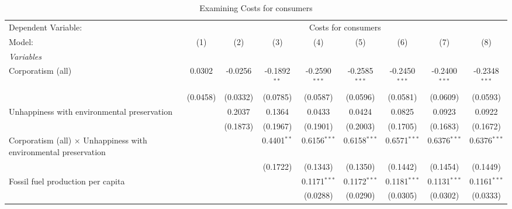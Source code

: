
\begin{table}[htbp]
   \caption{Examining Costs for consumers}
   \centering
   \begin{tabular}{lcccccccc}
      \tabularnewline \midrule \midrule
      Dependent Variable: & \multicolumn{8}{c}{Costs for consumers}\\
      Model:                                                                  & (1)      & (2)      & (3)            & (4)             & (5)             & (6)             & (7)                    & (8)\\  
      \midrule
      \emph{Variables}\\
      Corporatism (all)                                                       & 0.0302   & -0.0256  & -0.1892$^{**}$ & -0.2590$^{***}$ & -0.2585$^{***}$ & -0.2450$^{***}$ & -0.2400$^{***}$        & -0.2348$^{***}$\\   
                                                                              & (0.0458) & (0.0332) & (0.0785)       & (0.0587)        & (0.0596)        & (0.0581)        & (0.0609)               & (0.0593)\\   
      Unhappiness with environmental preservation                             &          & 0.2037   & 0.1364         & 0.0433          & 0.0424          & 0.0825          & 0.0923                 & 0.0922\\   
                                                                              &          & (0.1873) & (0.1967)       & (0.1901)        & (0.2003)        & (0.1705)        & (0.1683)               & (0.1672)\\   
      Corporatism (all) $\times$ Unhappiness with environmental preservation  &          &          & 0.4401$^{**}$  & 0.6156$^{***}$  & 0.6158$^{***}$  & 0.6571$^{***}$  & 0.6376$^{***}$         & 0.6376$^{***}$\\   
                                                                              &          &          & (0.1722)       & (0.1343)        & (0.1350)        & (0.1442)        & (0.1454)               & (0.1449)\\   
      Fossil fuel production per capita                                       &          &          &                & 0.1171$^{***}$  & 0.1172$^{***}$  & 0.1181$^{***}$  & 0.1131$^{***}$         & 0.1161$^{***}$\\   
                                                                              &          &          &                & (0.0288)        & (0.0290)        & (0.0305)        & (0.0302)               & (0.0333)\\   

\end{tabular}
\end{table}
